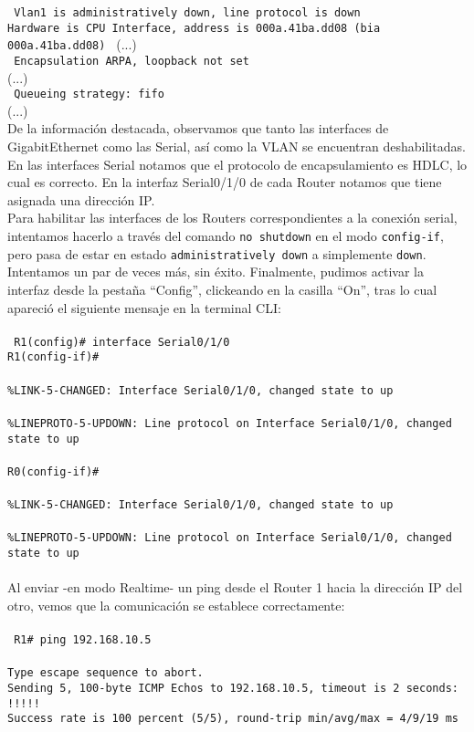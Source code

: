 \documentclass{article}
\begin{document}
\texttt{
Vlan1 is administratively down, line protocol is down \\
  Hardware is CPU Interface, address is 000a.41ba.dd08 (bia 000a.41ba.dd08)
}
  (...) \\
\texttt{
  Encapsulation ARPA, loopback not set
} \\
  (...) \\
\texttt{
  Queueing strategy: fifo
} \\
(...) \\

De la información destacada, observamos que tanto las interfaces de GigabitEthernet como las Serial, así como la VLAN se encuentran deshabilitadas. En las interfaces Serial notamos que el protocolo de encapsulamiento es HDLC, lo cual es correcto. En la interfaz Serial0/1/0 de cada Router notamos que tiene asignada una dirección IP. \\

Para habilitar las interfaces de los Routers correspondientes a la conexión serial, intentamos hacerlo a través del comando \texttt{no shutdown} en el modo \texttt{config-if}, pero pasa de estar en estado \texttt{administratively down} a simplemente \texttt{down}. Intentamos un par de veces más, sin éxito. Finalmente, pudimos activar la interfaz desde la pestaña ``Config'', clickeando en la casilla ``On'', tras lo cual apareció el siguiente mensaje en la terminal CLI: \\\\
\texttt{
R1(config)\# interface Serial0/1/0 \\
R1(config-if)\# \\\\
\%LINK-5-CHANGED: Interface Serial0/1/0, changed state to up \\\\
\%LINEPROTO-5-UPDOWN: Line protocol on Interface Serial0/1/0, changed state to up \\\\
R0(config-if)\# \\\\
\%LINK-5-CHANGED: Interface Serial0/1/0, changed state to up \\\\
\%LINEPROTO-5-UPDOWN: Line protocol on Interface Serial0/1/0, changed state to up \\
} \\

Al enviar -en modo Realtime- un ping desde el Router 1 hacia la dirección IP del otro, vemos que la comunicación se establece correctamente: \\\\
\texttt{
R1\# ping 192.168.10.5 \\\\
Type escape sequence to abort. \\
Sending 5, 100-byte ICMP Echos to 192.168.10.5, timeout is 2 seconds: \\
!!!!! \\
Success rate is 100 percent (5/5), round-trip min/avg/max = 4/9/19 ms
} \\
\end{document}

